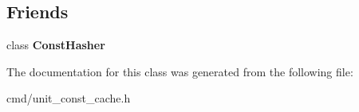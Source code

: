 \subsection*{Friends}
\begin{DoxyCompactItemize}
\item 
class {\bfseries Const\+Hasher}\hypertarget{classStringIntKey_a65296926d09243c22cc0a9424df95e84}{}\label{classStringIntKey_a65296926d09243c22cc0a9424df95e84}

\end{DoxyCompactItemize}


The documentation for this class was generated from the following file\+:\begin{DoxyCompactItemize}
\item 
cmd/unit\+\_\+const\+\_\+cache.\+h\end{DoxyCompactItemize}
